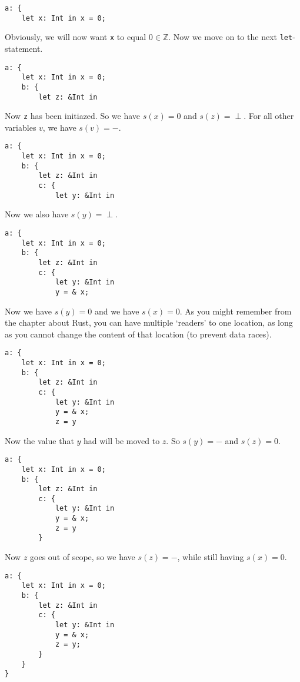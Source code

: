 \begin{verbatim}
a: {
    let x: Int in x = 0;
\end{verbatim}

Obviously, we will now want \verb|x| to equal $0 \in \mathbb{Z}$. Now we move on to the next \verb|let|-statement.

\begin{verbatim}
a: {
    let x: Int in x = 0;
    b: {
        let z: &Int in
\end{verbatim}

Now \verb|z| has been initiazed. So we have $s(x) = 0$ and $s(z) = \perp$. For all other variables $v$, we have $s(v) = -$. 

\begin{verbatim}
a: {
    let x: Int in x = 0;
    b: {
        let z: &Int in 
        c: {
            let y: &Int in
\end{verbatim}

Now we also have $s(y) = \perp$.

\begin{verbatim}
a: {
    let x: Int in x = 0;
    b: {
        let z: &Int in 
        c: {
            let y: &Int in
            y = & x;
\end{verbatim}

Now we have $s(y) = 0$ and we have $s(x) = 0$. As you might remember from the chapter about Rust, you can have multiple `readers' to one location, as long as you cannot change the content of that location (to prevent data races). 

\begin{verbatim}
a: {
    let x: Int in x = 0;
    b: {
        let z: &Int in 
        c: {
            let y: &Int in
            y = & x;
            z = y
\end{verbatim}

Now the value that $y$ had will be moved to $z$. So $s(y) = -$ and $s(z) = 0$. 

\begin{verbatim}
a: {
    let x: Int in x = 0;
    b: {
        let z: &Int in 
        c: {
            let y: &Int in
            y = & x;
            z = y
        }
\end{verbatim}

Now $z$ goes out of scope, so we have $s(z) = -$, while still having $s(x) = 0$. 

\begin{verbatim}
a: {
    let x: Int in x = 0;
    b: {
        let z: &Int in 
        c: {
            let y: &Int in
            y = & x;
            z = y;
        }
    }
}
\end{verbatim} 

